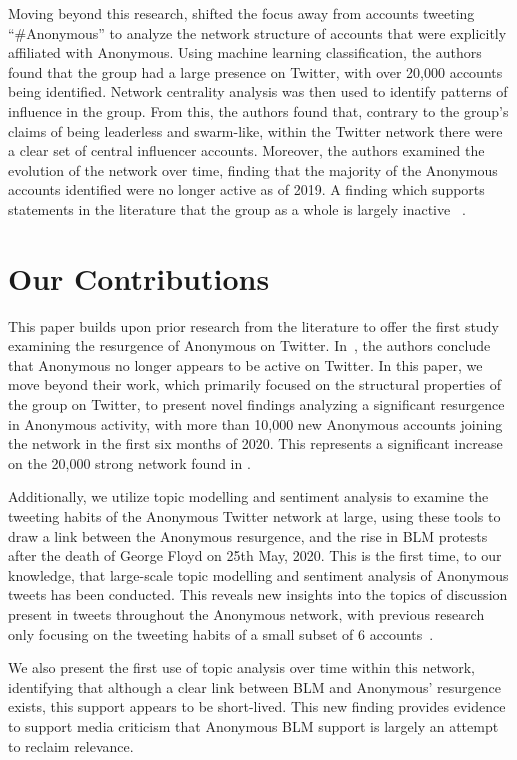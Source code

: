 \documentclass[letterpaper]{article}
\begin{document}
Moving beyond this research, \citet{Jones2020} shifted the focus away from accounts tweeting ``\#Anonymous'' to analyze the network structure of accounts that were explicitly affiliated with Anonymous. Using machine learning classification, the authors found that the group had a large presence on Twitter, with over 20,000 accounts being identified. Network centrality analysis was then used to identify patterns of influence in the group. From this, the authors found that, contrary to the group's claims of being leaderless and swarm-like, within the Twitter network there were a clear set of central influencer accounts. Moreover, the authors examined the evolution of the network over time, finding that the majority of the Anonymous accounts identified were no longer active as of 2019. A finding which supports statements in the literature that the group as a whole is largely inactive~\cite{Uitermark2017} .

\section{Our Contributions}

This paper builds upon prior research from the literature to offer the first study examining the resurgence of Anonymous on Twitter. In~\citep{Jones2020}, the authors conclude that Anonymous no longer appears to be active on Twitter. In this paper, we move beyond their work, which primarily focused on the structural properties of the group on Twitter, to present novel findings analyzing a significant resurgence in Anonymous activity, with more than 10,000 new Anonymous accounts joining the network in the first six months of 2020. This represents a significant increase on the 20,000 strong network found in \citep{Jones2020}.

Additionally, we utilize topic modelling and sentiment analysis to examine the tweeting habits of the Anonymous Twitter network at large, using these tools to draw a link between the Anonymous resurgence, and the rise in BLM protests after the death of George Floyd on 25th May, 2020. This is the first time, to our knowledge, that large-scale topic modelling and sentiment analysis of Anonymous tweets has been conducted. This reveals new insights into the topics of discussion present in tweets throughout the Anonymous network, with previous research only focusing on the tweeting habits of a small subset of 6 accounts~\cite{Jones2020}.

We also present the first use of topic analysis over time within this network, identifying that although a clear link between BLM and Anonymous' resurgence exists, this support appears to be short-lived. This new finding provides evidence to support media criticism that Anonymous BLM support is largely an attempt to reclaim relevance. 
\end{document}
